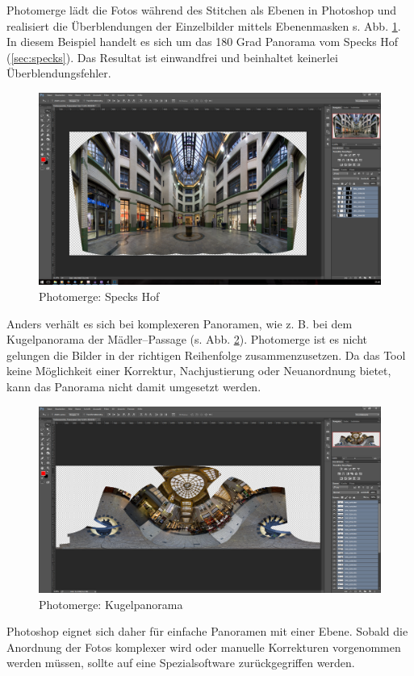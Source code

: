 \documentclass[liststotoc,bibtotoc,fontsize=14pt,]{scrreprt}
\begin{document}
	Photomerge lädt die Fotos während des Stitchen als Ebenen in Photoshop und realisiert die Überblendungen der Einzelbilder mittels Ebenenmasken s. Abb. \ref{img:photoshop_step_3}. In diesem Beispiel handelt es sich um das 180 Grad Panorama vom Speck\grq s Hof (\ref{sec:specks}). Das Resultat ist einwandfrei und beinhaltet keinerlei Überblendungsfehler.
	\begin{figure}[H]
		\includegraphics[width=\linewidth]{img/steps/Photoshop_Step_3.png}
		\caption{Photomerge: Speck\grq s Hof}
		\label{img:photoshop_step_3}
	\end{figure}
	\bigskip
	Anders verhält es sich bei komplexeren Panoramen, wie z. B. bei dem Kugelpanorama der Mädler--Passage (s. Abb. \ref{img:photoshop_step_kugel}). Photomerge ist es nicht gelungen die Bilder in der richtigen Reihenfolge zusammenzusetzen. Da das Tool keine Möglichkeit einer Korrektur, Nachjustierung oder Neuanordnung bietet, kann das Panorama nicht damit umgesetzt werden.
	\begin{figure}[H]
		\includegraphics[width=\linewidth]{img/steps/Photoshop_Step_Kugel.png}
		\caption{Photomerge: Kugelpanorama}
		\label{img:photoshop_step_kugel}
	\end{figure}
	\bigskip
	Photoshop eignet sich daher für einfache Panoramen mit einer Ebene. Sobald die Anordnung der Fotos komplexer wird oder manuelle Korrekturen vorgenommen werden müssen, sollte auf eine Spezialsoftware zurückgegriffen werden.  
	
\end{document}
